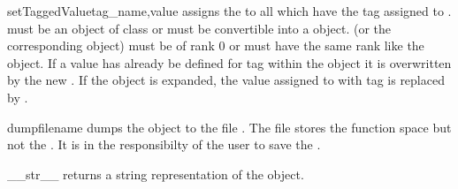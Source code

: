 \begin{methoddesc}[Data]{setTaggedValue}{tag_name,value}
assigns the  to all \DataSamplePoints which have the tag
assigned to .  must be an object of class
 or must be convertible into a
 object.  (or the corresponding
 object) must be of rank $0$ or must have the
same rank like the object.
If a value has already be defined for tag  within the object
it is overwritten by the new .  If the object is expanded,
the value assigned to \DataSamplePoints with tag  is replaced by
.
\end{methoddesc}

\begin{methoddesc}[Data]{dump}{filename}
dumps the \Data object to the file . The file stores the
function space but not the \Domain. It is in the responsibilty of the user to
save the \Domain. 
\end{methoddesc}

\begin{methoddesc}[Data]{__str__}{}
returns a string representation of the object.
\end{methoddesc}

